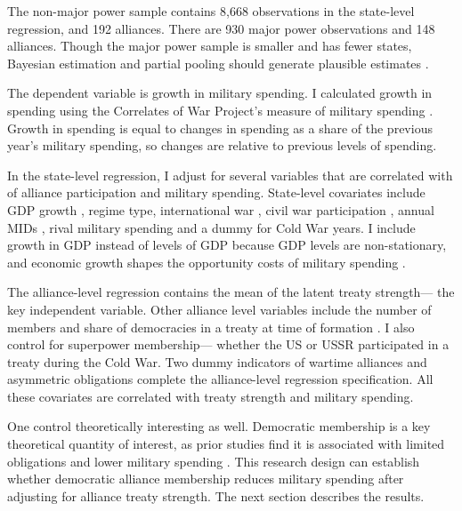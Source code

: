 \documentclass[12pt]{article}
\begin{document}
The non-major power sample contains 8,668 observations in the state-level regression, and 192 alliances. 
There are 930 major power observations and 148 alliances. 
Though the major power sample is smaller and has fewer states, Bayesian estimation and partial pooling should generate plausible estimates \citep{Stegmueller2013}. 

The dependent variable is growth in military spending.
I calculated growth in spending using the Correlates of War Project's measure of military spending \citep{SingerCINC1988}. 
Growth in spending is equal to changes in spending as a share of the previous year's military spending, so changes are relative to previous levels of spending. 


In the state-level regression, I adjust for several variables that are correlated with of alliance participation and military spending. 
State-level covariates include GDP growth \citep{Boltetal2018}, regime type, international war \citep{Reiteretal2016}, civil war participation \citep{SarkeesWayman2010}, annual MIDs \citep{Gibleretal2016}, rival military spending \citep{ThompsonDreyer2012} and a dummy for Cold War years.
I include growth in GDP instead of levels of GDP because GDP levels are non-stationary, and economic growth shapes the opportunity costs of military spending \citep{Kimball2010, Zielinskietal2017}.


The alliance-level regression contains the mean of the latent treaty strength--- the key independent variable. 
Other alliance level variables include the number of members and share of democracies in a treaty at time of formation \citep{Chibaetal2015}.
I also control for superpower membership--- whether the US or USSR participated in a treaty during the Cold War. 
Two dummy indicators of wartime alliances and asymmetric obligations \citep{Leedsetal2002} complete the alliance-level regression specification. 
All these covariates are correlated with treaty strength and military spending. 


One control theoretically interesting as well. 
Democratic membership is a key theoretical quantity of interest, as prior studies find it is associated with limited obligations \citep{Chibaetal2015} and lower military spending \citep{DigiuseppePoast2016}.
This research design can establish whether democratic alliance membership reduces military spending after adjusting for alliance treaty strength. 
The next section describes the results.
 
\end{document}
